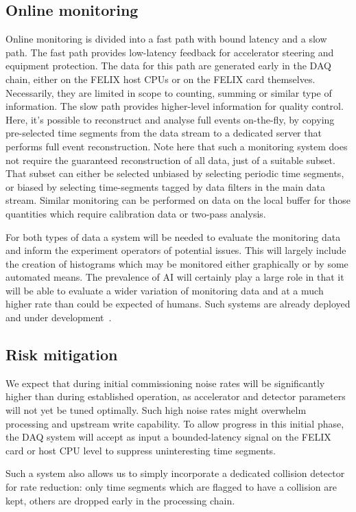 \subsection{Online monitoring}\label{subsec:online_mon}
Online monitoring is divided into a fast path with bound latency and a slow path. The fast path provides low-latency feedback for accelerator steering and equipment protection. The data for this path are generated early in the DAQ chain, either on the FELIX host CPUs or on the FELIX card themselves. Necessarily, they are limited in scope to counting, summing or similar type of information. The slow path provides higher-level information for quality control. Here, it's possible to reconstruct and analyse full events on-the-fly, by copying pre-selected time segments from the data stream to a dedicated server that performs full event reconstruction. Note here that such a monitoring system does not require the guaranteed reconstruction of all data, just of a suitable subset. That subset can either be selected unbiased by selecting periodic time segments, or biased by selecting time-segments tagged by data filters in the main data stream.  Similar monitoring can be performed on data on the local buffer for those quantities which require calibration data or two-pass analysis.

For both types of data a system will be needed to evaluate the monitoring data and inform the experiment operators of potential issues. This will largely include the creation of histograms which may be monitored either graphically or by some automated means. The prevalence of AI will certainly play a large role in that it will be able to evaluate a wider variation of monitoring data and at a much higher rate than could be expected of humans. Such systems are already deployed and under development~\cite{Hydra2021}. 

\subsection{Risk mitigation}
We expect that during initial commissioning noise rates will be significantly higher than during established operation, as accelerator and detector parameters will not yet be tuned optimally. Such high noise rates might overwhelm processing and upstream write capability. To allow progress in this initial phase, the DAQ system will accept as input a bounded-latency signal on the FELIX card or host CPU level to suppress uninteresting time segments.

Such a system also allows us to simply incorporate a dedicated collision detector for rate reduction: only time segments which are flagged to have a collision are kept, others are dropped early in the processing chain. 

